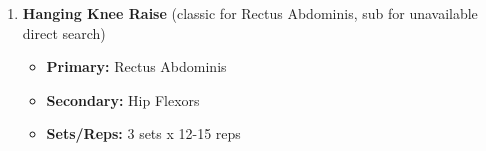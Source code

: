 \documentclass{article}
\begin{document}
\begin{enumerate}[label=\arabic*., wide=0pt, leftmargin=*]
    \item \textbf{Hanging Knee Raise} (classic for Rectus Abdominis, sub for unavailable direct search)
        \begin{itemize}[label=\textbullet, leftmargin=*, nosep, topsep=0pt, partopsep=0pt]
            \item \textbf{Primary:} Rectus Abdominis
            \item \textbf{Secondary:} Hip Flexors
            \item \textbf{Sets/Reps:} 3 sets x 12-15 reps
        \end{itemize}
\end{enumerate}
\end{document}
